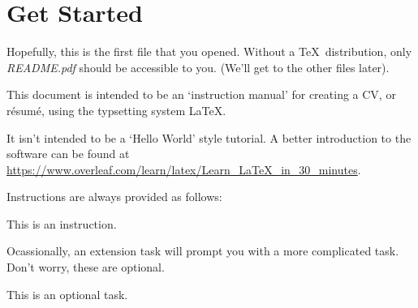 \section{Get Started}
Hopefully, this is the first file that you opened. Without a \TeX~distribution, only \emph{README.pdf} should be accessible to you. (We'll get to the other files later). \par

This document is intended to be an `instruction manual' for creating a CV, or r\'esum\'e, using the typsetting system \LaTeX. \par

It isn't intended to be a `Hello World' style tutorial. A better introduction to the software can be found at \url{https://www.overleaf.com/learn/latex/Learn\_LaTeX\_in\_30\_minutes}. \par

Instructions are always provided as follows: \par

\begin{instrct}
This is an instruction.
\end{instrct}

Ocassionally, an extension task will prompt you with a more complicated task. Don't worry, these are optional. \par

\begin{ext}
This is an optional task.
\end{ext}

\setcounter{step}{0}